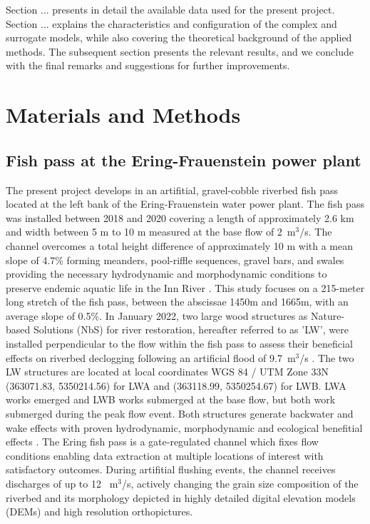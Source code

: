 \documentclass[draft,linenumbers,onecolumn]{agujournal2019} %
\begin{document}
Section ... presents in detail the available data used for the present project. Section ... explains the characteristics and configuration of the complex and surrogate models, while also covering the theoretical background of the applied methods. The subsequent section presents the relevant results, and we conclude with the final remarks and suggestions for further improvements.


\section{Materials and Methods} 
\label{Materials}

\subsection{Fish pass at the Ering-Frauenstein power plant}
\label{subsec:Sec2.1 }
The present project develops in an artifitial, gravel-cobble riverbed fish pass located at the left bank of the Ering-Frauenstein water power plant. The fish pass was installed between 2018 and 2020 covering a length of approximately 2.6 km  and width between 5 m to 10 m measured at the base flow of  2~m$^3$/s. The channel overcomes a total height difference of approximately 10 m with a mean slope of 4.7\% forming meanders, pool-riffle sequences, gravel bars, and swales providing the necessary hydrodynamic and morphodynamic conditions to preserve endemic aquatic life in the Inn River \cite{schwindt2023fuzzylogic,zauner2020wie}. This study focuses on a 215-meter long stretch of the fish pass, between the abscissae 1450m and 1665m, with an average slope of 0.5\%. In January 2022, two large wood structures as Nature-based Solutions (NbS) for river restoration, hereafter referred to as 'LW', were installed perpendicular to the flow within the fish pass to assess their beneficial effects on riverbed declogging following an artificial flood of 9.7~m$^3$/s  \cite{schwindt2023fuzzylogic}. The two LW structures are located at local coordinates WGS 84 / UTM Zone 33N (363071.83, 5350214.56) for LWA and (363118.99, 5350254.67) for LWB. LWA works emerged and LWB works submerged at the base flow, but both work submerged during the peak flow event. Both structures generate backwater and wake effects with proven  hydrodynamic, morphodynamic and ecological benefitial effects \cite{schalko2021flow,schwindt2023fuzzylogic}.    
The Ering fish pass is a gate-regulated channel which fixes flow conditions enabling data extraction at multiple locations of interest with satisfactory outcomes. During artifitial flushing events, the channel receives discharges of up to 12 ~m$^3$/s, actively changing the grain size composition of the riverbed and its morphology depicted in highly detailed digital elevation models (DEMs) and high resolution orthopictures.
\end{document}
